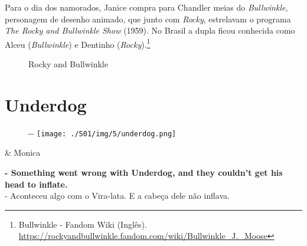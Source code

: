 \saveparinfos
\noindent
\begin{minipage}[c]{0.5\textwidth}\useparinfo

Para o dia dos namorados, Janice compra para Chandler meias do
\emph{Bullwinkle}, personagem de desenho animado, que junto com
\emph{Rocky}, estrelavam o programa \emph{The Rocky and Bullwinkle Show}
(1959). No Brasil a dupla ficou conhecida como Alceu (\emph{Bullwinkle})
e Dentinho (\emph{Rocky}).\footnote{\sloppy Bullwinkle - Fandom Wiki (Inglês). \url{https://rockyandbullwinkle.fandom.com/wiki/Bullwinkle_J._Moose}}

\end{minipage}\hfill
\begin{minipage}[c]{0.5\textwidth}

\begin{figure}
  \centering
    \caption{Rocky and Bullwinkle\label{fig:rocky-and-bullwinkle}}
\end{figure}

\end{minipage}

\hypertarget{underdog}{%
\section{Underdog}\label{underdog}}

\begin{figure}[!ht]
  \begin{adjustwidth}{-\oddsidemargin-1in}{-\rightmargin}
    \centering
    \texttt{[image: ./S01/img/5/underdog.png]}
  \end{adjustwidth}
\end{figure}

\begin{tcolorbox}[enhanced,center upper,
    drop fuzzy shadow southeast, boxrule=0.3pt,
    lower separated=false,
    colframe=black!30!dialogoBorder,colback=white]
\begin{minipage}[c]{0.16\linewidth}
   & \centering \scriptsize{Monica}
\end{minipage}
\hfill
\begin{minipage}[c]{0.8\linewidth}
  \textbf{- Something went wrong with Underdog, and they couldn't get his head to inflate.}\\
  - Aconteceu algo com o Vira-lata. E a cabeça dele não inflava.
\end{minipage}
\end{tcolorbox}

